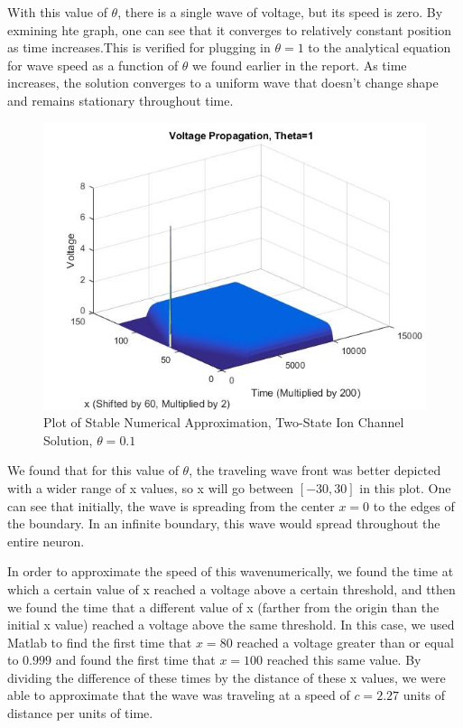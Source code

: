 \documentclass[12pt]{article}
\begin{document}
With this value of $\theta$, there is a single wave of voltage, but its speed is zero. By exmining hte graph, one can see that it converges to relatively constant position as time increases.This is verified for plugging in $\theta=1$ to the analytical equation for wave speed as a function of $\theta$ we found earlier in the report. As time increases, the solution converges to a uniform wave that doesn't change shape and remains stationary throughout time.
\begin{figure}[H]
  \includegraphics[width=\linewidth]{thetathree.jpg}
  \caption{Plot of Stable Numerical Approximation, Two-State Ion Channel Solution, $\theta=0.1$}
  \label{fig:sketch6}
\end{figure}
We found that for this value of $\theta$, the traveling wave front was better depicted with a wider range of x values, so x will go between $[-30,30]$ in this plot. One can see that initially, the wave is spreading from the center $x=0$ to the edges of the boundary. In an infinite boundary, this wave would spread throughout the entire neuron. \par
In order to approximate the speed of this wavenumerically, we found the time at which a certain value of x reached a voltage above a certain threshold, and tthen we found the time that a different value of x (farther from the origin than the initial x value) reached a voltage above the same threshold. In this case, we used Matlab to find the first time that $x=80$ reached a voltage greater than or equal to $0.999$ and found the first time that $x=100$ reached this same value. By dividing the difference of these times by the distance of these x values, we were able to approximate that the wave was traveling at a speed of $c=2.27$ units of distance per units of time. \par
\end{document}
